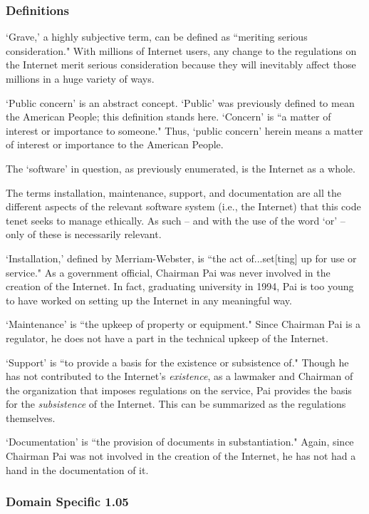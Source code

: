 \documentclass[12pt]{article}
\begin{document}
\begin{multicols}{2}
  \subsubsection{Definitions}
  `Grave,' a highly subjective term, can be defined as ``meriting serious consideration."\cite{webster} With millions of Internet users, any change to the regulations on the Internet merit serious consideration because they will inevitably affect those millions in a huge variety of ways.
  
  `Public concern' is an abstract concept. `Public' was previously defined to mean the American People; this definition stands here. `Concern' is ``a matter of interest or importance to someone."\cite{oxford} Thus, `public concern' herein means a matter of interest or importance to the American People.
  
  The `software' in question, as previously enumerated, is the Internet as a whole.
  
  The terms installation, maintenance, support, and documentation are all the different aspects of the relevant software system (i.e., the Internet) that this code tenet seeks to manage ethically. As such -- and with the use of the word `or' -- only of these is necessarily relevant.
  
   `Installation,' defined by Merriam-Webster, is ``the act of...set[ting] up for use or service."\cite{webster} As a government official, Chairman Pai was never involved in the creation of the Internet. In fact, graduating university in 1994, Pai is too young to have worked on setting up the Internet in any meaningful way.\cite{fcc-pai-page}
   
   `Maintenance' is ``the upkeep of property or equipment."\cite{webster} Since Chairman Pai is a regulator, he does not have a part in the technical upkeep of the Internet.
   
   `Support' is ``to provide a basis for the existence or subsistence of."\cite{webster} Though he has not contributed to the Internet's \textit{existence}, as a lawmaker and Chairman of the organization that imposes regulations on the service, Pai provides the basis for the \textit{subsistence} of the Internet. This can be summarized as the regulations themselves.
   
   `Documentation' is ``the provision of documents in substantiation."\cite{webster} Again, since Chairman Pai was not involved in the creation of the Internet, he has not had a hand in the documentation of it.
  
  \subsubsection{Domain Specific 1.05}
  

\end{multicols}
\end{document}
